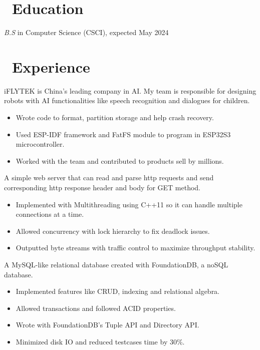 \documentclass{resume}
\begin{document}



\section{\faGraduationCap\ Education}
\textit{B.S} in Computer Science (CSCI), expected May 2024

\section{\faUsers\ Experience}
  iFLYTEK is China's leading company in AI. My team is responsible for designing robots with AI functionalities like speech recognition and dialogues for children.
\begin{itemize}
  \item Wrote code to format, partition storage and help crash recovery.
  \item Used ESP-IDF framework and FatFS module to program in ESP32S3 microcontroller.
  \item Worked with the team and contributed to products sell by millions.
\end{itemize}

  A simple web server that can read and parse http requests and send corresponding http response header and body for GET method.
\begin{itemize}
  \item Implemented with Multithreading using C++11 so it can handle multiple connections at a time.
  \item Allowed concurrency with lock hierarchy to fix deadlock issues.
  \item Outputted byte streams with traffic control to maximize throughput stability.
\end{itemize}

  A MySQL-like relational database created with FoundationDB, a noSQL database.
\begin{itemize}
  \item Implemented features like CRUD, indexing and relational algebra.
  \item Allowed transactions and followed ACID properties.
  \item Wrote with FoundationDB's Tuple API and Directory API.
  \item Minimized disk IO and reduced testcases time by 30\%.
\end{itemize}
\end{document}
